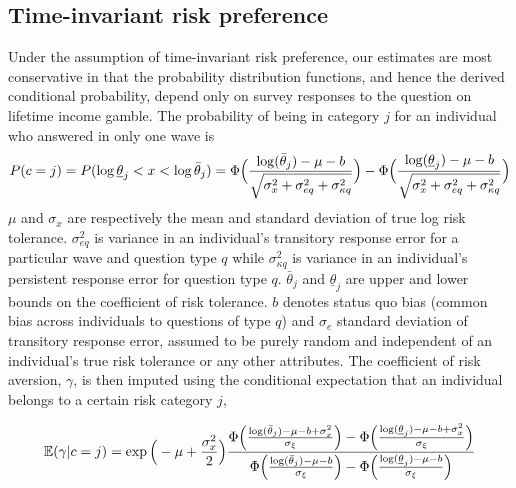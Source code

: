 \documentclass[emulatestandardclasses, 10pt, abstract = true]{scrartcl}
\begin{document}
\subsection{Time-invariant risk preference}
Under the assumption of time-invariant risk preference, our estimates are most conservative in that the probability distribution functions, and hence the derived conditional probability, depend only on survey responses to the question on lifetime income gamble. The probability of being in category $j$ for an individual who answered in only one wave is 
\parskip 0cm
\begin{equation}
P(c=j)=P(\log\underline{\theta}_j<x<\log\bar{\theta}_j)=\Phi\Big({\log(\bar{\theta}_j)-\mu-b\over\sqrt{\sigma_x^2+\sigma_{eq}^2+\sigma_{\kappa q}^2}}\Big)-\Phi\Big({\log(\underline{\theta}_j)-\mu-b\over\sqrt{\sigma_x^2+\sigma_{eq}^2+\sigma_{\kappa q}^2}}\Big) 
\label{eq:A-likelihood-constant-univariate}	
\end{equation}
$\mu$ and $\sigma_x$ are respectively the mean and standard deviation of true log risk tolerance. $\sigma_{eq}^2$ is variance in an individual's transitory response error for a particular wave and question type $q$ while $\sigma_{\kappa q}^2$ is variance in an individual's persistent response error for question type $q$. $\bar \theta_j$ and $\underline{\theta}_j$ are upper and lower bounds on the coefficient of risk tolerance. $b$ denotes status quo bias (common bias across individuals to questions of type $q$) and $\sigma_e$ standard deviation of transitory response error, assumed to be purely random and independent of an individual's true risk tolerance or any other attributes. The coefficient of risk aversion, $\gamma$, is then imputed using the conditional expectation that an individual belongs to a certain risk category $j$,

\begin{equation}
\mathbb E(\gamma|c=j)=\exp\Big(-\mu+{\sigma_x^2\over 2}\Big){\Phi\Big({\log(\bar{\theta}_j)-\mu-b+\sigma_x^2\over \sigma_{\xi}}\Big)-\Phi\Big({\log(\underline{\theta}_j)-\mu-b+\sigma_x^2\over \sigma_{\xi}}\Big)\over \Phi\Big({\log(\bar{\theta}_j)-\mu-b\over \sigma_\xi}\Big)-\Phi\Big({\log(\underline{\theta}_j)-\mu-b\over \sigma_\xi}\Big)}
\label{eq:A-conditional-expectation}
\end{equation}
\end{document}
